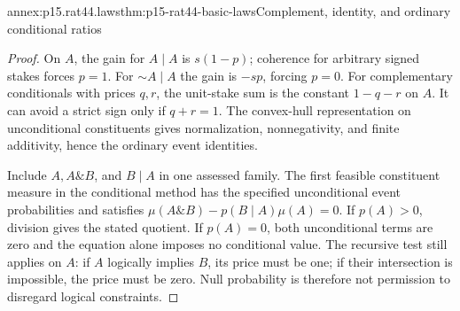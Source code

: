 \begin{annexitem}{annex:p15.rat44.laws}{thm:p15-rat44-basic-laws}{Complement, identity, and ordinary conditional ratios}
\begin{proof}
On \(A\), the gain for \(A\mid A\) is \(s(1-p)\); coherence
for arbitrary signed stakes forces \(p=1\). For \(\sim A\mid A\)
the gain is \(-sp\), forcing \(p=0\). For complementary
conditionals with prices \(q,r\), the unit-stake sum is the constant
\(1-q-r\) on \(A\). It can avoid a strict sign only if
\(q+r=1\). The convex-hull representation on unconditional
constituents gives normalization, nonnegativity, and finite additivity,
hence the ordinary event identities.

Include \(A,A\mathbin{\&}B\), and \(B\mid A\) in one assessed
family. The first feasible constituent measure in the conditional
method has the specified unconditional event probabilities and
satisfies
\(\mu(A\mathbin{\&}B)-p(B\mid A)\mu(A)=0\).
If \(p(A)>0\), division gives the stated quotient. If \(p(A)=0\),
both unconditional terms are zero and the equation alone imposes
no conditional value. The recursive test still applies on \(A\):
if \(A\) logically implies \(B\), its price must be one; if their
intersection is impossible, the price must be zero. Null probability
is therefore not permission to disregard logical constraints.
\end{proof}
\end{annexitem}

